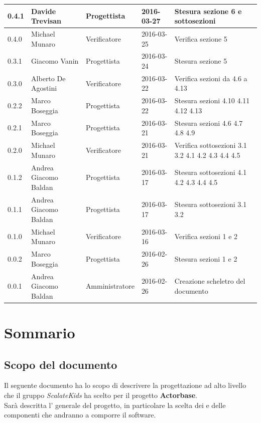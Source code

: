 \documentclass{scalatekids-article}
\begin{document}
\begin{center}
\begin{longtable}{| l | l | l | l | p{5cm} |}
    \hline
    0.4.1 & Davide Trevisan & Progettista & 2016-03-27 & Stesura sezione 6 e sottosezioni\\
    \hline
    0.4.0 & Michael Munaro & Verificatore & 2016-03-25 & Verifica sezione 5\\
    \hline
    0.3.1 & Giacomo Vanin & Progettista & 2016-03-24 & Stesura sezione 5\\
    \hline
    0.3.0 & Alberto De Agostini & Verificatore & 2016-03-22 & Verifica sezioni da 4.6 a 4.13\\
    \hline
    0.2.2 & Marco Boseggia & Progettista & 2016-03-22 & Stesura sezioni 4.10 4.11 4.12 4.13\\
    \hline
    0.2.1 & Marco Boseggia & Progettista & 2016-03-21 & Stesura sezioni 4.6 4.7 4.8 4.9\\
    \hline
    0.2.0 & Michael Munaro & Verificatore & 2016-03-21 & Verifica sottosezioni 3.1 3.2 4.1 4.2 4.3 4.4 4.5\\
    \hline
    0.1.2 & Andrea Giacomo Baldan & Progettista & 2016-03-17 & Stesura sottosezioni 4.1 4.2 4.3 4.4 4.5\\
    \hline
    0.1.1 & Andrea Giacomo Baldan & Progettista & 2016-03-17 & Stesura sottosezioni 3.1 3.2\\
    \hline
    0.1.0 & Michael Munaro & Verificatore & 2016-03-16 & Verifica sezioni 1 e 2\\
    \hline
    0.0.2 & Marco Boseggia & Progettista & 2016-02-26 & Stesura sezioni 1 e 2\\
    \hline
    0.0.1 & Andrea Giacomo Baldan & Amministratore & 2016-02-26 & Creazione scheletro del documento\\
    \hline
  \end{longtable}
\end{center}
\newpage
\tableofcontents
\newpage
{}

\section{Sommario}

\subsection{Scopo del documento}

Il seguente documento ha lo scopo di descrivere la progettazione ad alto livello
che il gruppo \textit{ScalateKids} ha scelto per il
progetto \textbf{Actorbase}.\\  Sarà descritta l' generale
del progetto, in particolare  la scelta dei  e delle
componenti che andranno a comporre il software.
\end{document}
